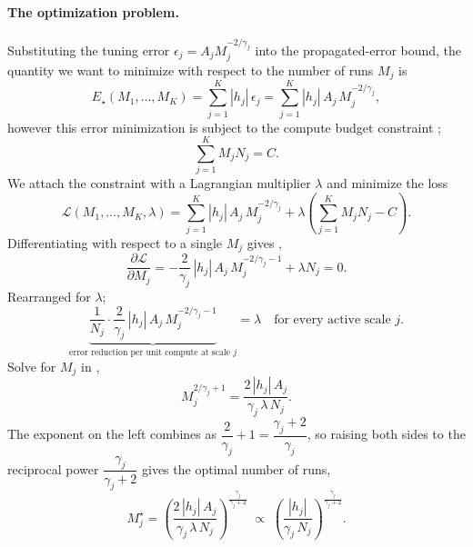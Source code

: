 \paragraph{The optimization problem.}
Substituting the tuning error $\epsilon_j = A_j M_j^{-2/\gamma_j}$ into the propagated-error bound, the quantity we want to minimize with respect to the number of runs $M_j$ is
%
\begin{equation}\label{eq:objective}
    E_\star(M_1, \dots, M_K) = \sum_{j=1}^{K} |h_j|\, \epsilon_j = \sum_{j=1}^{K} |h_j|\, A_j\, M_j^{-2/\gamma_j},
\end{equation}
%
however this error minimization is subject to the compute budget constraint ;
%
\begin{equation}\label{eq:constraint}
    \sum_{j=1}^{K} M_j N_j = C.
\end{equation}
%
We attach the constraint with a Lagrangian multiplier $\lambda$ and minimize the loss
%
\begin{equation}\label{eq:lagrangian}
    \mathcal{L}(M_1, \dots, M_K, \lambda) = \sum_{j=1}^{K} |h_j|\, A_j\, M_j^{-2/\gamma_j} + \lambda\left(\sum_{j=1}^{K} M_j N_j - C\right).
\end{equation}
%
Differentiating with respect to a single $M_j$ gives ,
%
\begin{equation}\label{eq:foc}
    \frac{\partial \mathcal{L}}{\partial M_j}
    = -\frac{2}{\gamma_j}\, |h_j|\, A_j\, M_j^{-2/\gamma_j - 1} + \lambda N_j
    = 0.
\end{equation}
%
Rearranged for $\lambda$;
%
\begin{equation}\label{eq:equimarginal}
    \underbrace{\frac{1}{N_j}\cdot\frac{2}{\gamma_j}\, |h_j|\, A_j\, M_j^{-2/\gamma_j - 1}}_{\text{error reduction per unit compute at scale } j} = \lambda \quad\text{for every active scale } j.
\end{equation}
%
Solve for $M_j$ in ,
%
\begin{equation}\label{eq:solve-step}
    M_j^{2/\gamma_j + 1} = \frac{2\, |h_j|\, A_j}{\gamma_j\, \lambda\, N_j}.
\end{equation}
%
The exponent on the left combines as $\dfrac{2}{\gamma_j} + 1 = \dfrac{\gamma_j + 2}{\gamma_j}$, so raising both sides to the reciprocal power $\dfrac{\gamma_j}{\gamma_j + 2}$ gives the optimal number of runs,
%
\begin{equation}\label{eq:opt-runs}
    M_j^\star = \left(\frac{2\,|h_j|\, A_j}{\gamma_j\, \lambda\, N_j}\right)^{\frac{\gamma_j}{\gamma_j + 2}}
    \;\propto\; \left(\frac{|h_j|}{\gamma_j\, N_j}\right)^{\frac{\gamma_j}{\gamma_j + 2}}.
\end{equation}
%
